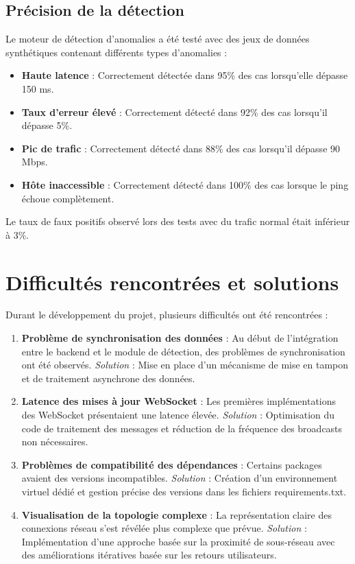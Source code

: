 \documentclass[12pt,a4paper]{report}
\begin{document}
\subsection{Précision de la détection}
Le moteur de détection d'anomalies a été testé avec des jeux de données synthétiques contenant différents types d'anomalies :
\begin{itemize}
    \item \textbf{Haute latence} : Correctement détectée dans 95\% des cas lorsqu'elle dépasse 150 ms.
    \item \textbf{Taux d'erreur élevé} : Correctement détecté dans 92\% des cas lorsqu'il dépasse 5\%.
    \item \textbf{Pic de trafic} : Correctement détecté dans 88\% des cas lorsqu'il dépasse 90 Mbps.
    \item \textbf{Hôte inaccessible} : Correctement détecté dans 100\% des cas lorsque le ping échoue complètement.
\end{itemize}

Le taux de faux positifs observé lors des tests avec du trafic normal était inférieur à 3\%.

\section{Difficultés rencontrées et solutions}
Durant le développement du projet, plusieurs difficultés ont été rencontrées :

\begin{enumerate}
    \item \textbf{Problème de synchronisation des données} : Au début de l'intégration entre le backend et le module de détection, des problèmes de synchronisation ont été observés. \textit{Solution} : Mise en place d'un mécanisme de mise en tampon et de traitement asynchrone des données.

    \item \textbf{Latence des mises à jour WebSocket} : Les premières implémentations des WebSocket présentaient une latence élevée. \textit{Solution} : Optimisation du code de traitement des messages et réduction de la fréquence des broadcasts non nécessaires.

    \item \textbf{Problèmes de compatibilité des dépendances} : Certains packages avaient des versions incompatibles. \textit{Solution} : Création d'un environnement virtuel dédié et gestion précise des versions dans les fichiers requirements.txt.

    \item \textbf{Visualisation de la topologie complexe} : La représentation claire des connexions réseau s'est révélée plus complexe que prévue. \textit{Solution} : Implémentation d'une approche basée sur la proximité de sous-réseau avec des améliorations itératives basée sur les retours utilisateurs.
\end{enumerate}
\end{document}
